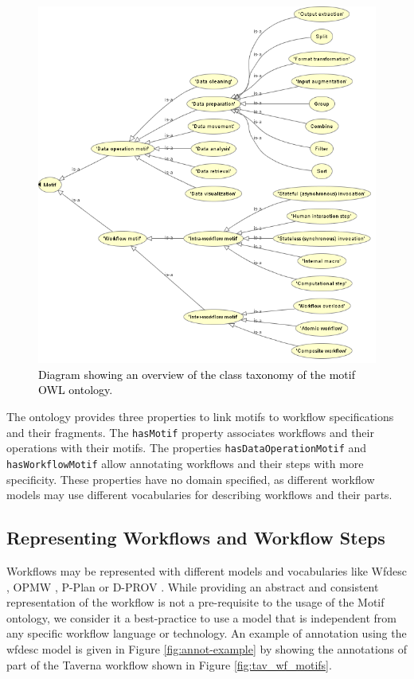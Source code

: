 \begin{figure}[t!]
\centering
\includegraphics[scale=0.60]{Figures/ontology.png}
\caption{\textcolor{black}{Diagram showing an overview of the class taxonomy of the motif OWL ontology.}}
\label{fig:ontology}
\end{figure}  

The ontology provides three properties to link motifs to workflow specifications and their fragments. The {\tt  hasMotif} property associates workflows and their operations with their motifs. The properties {\tt  hasDataOperationMotif} and {\tt  hasWorkflowMotif} allow annotating workflows and their steps with more specificity. These properties have no domain specified, as different workflow models may use different vocabularies for describing workflows and their parts. 

\subsection{Representing Workflows and Workflow Steps}
Workflows may be represented with different models and vocabularies like Wfdesc \cite{ro_model}, OPMW \cite{garijo_gil_2011}, P-Plan  \cite{garijo-gil-lisc12} or D-PROV \cite{Missier2013a}. While providing an abstract and consistent representation of the workflow is not a pre-requisite to the usage of the Motif ontology, we consider it a best-practice to use a model that is independent from any specific workflow language or technology. An example of annotation using the wfdesc model is given in Figure \ref{fig:annot-example} by showing the annotations of part of the Taverna workflow shown in Figure \ref{fig:tav_wf_motifs}. 

